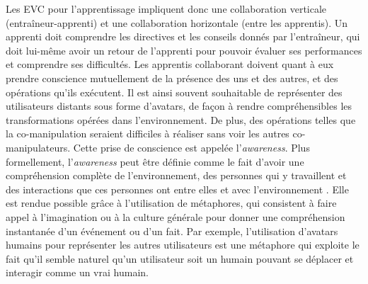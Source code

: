 \documentclass[11pt]{article}
\begin{document}
Les EVC pour l'apprentissage impliquent donc une collaboration verticale (entraîneur-apprenti) et une collaboration horizontale (entre les apprentis). Un apprenti doit comprendre les directives et les conseils donnés par l'entraîneur, qui doit lui-même avoir un retour de l'apprenti pour pouvoir évaluer ses performances et comprendre ses difficultés. Les apprentis collaborant doivent quant à eux prendre conscience mutuellement de la présence des uns et des autres, et des opérations qu'ils exécutent. Il est ainsi souvent souhaitable de représenter des utilisateurs distants sous forme d'avatars, de façon à rendre compréhensibles les transformations opérées dans l'environnement. De plus, des opérations telles que la co-manipulation seraient difficiles à réaliser sans voir les autres co-manipulateurs. Cette prise de conscience est appelée l'\textit{awareness}. Plus formellement, l'\textit{awareness} peut être définie comme le fait d'avoir une compréhension complète de l'environnement, des personnes qui y travaillent et des interactions que ces personnes ont entre elles et avec l'environnement \cite{survey}. Elle est rendue possible grâce à l'utilisation de métaphores, qui consistent à faire appel à l'imagination ou à la culture générale pour donner une compréhension instantanée d'un événement ou d'un fait. Par exemple, l'utilisation d'avatars humains pour représenter les autres utilisateurs est une métaphore qui exploite le fait qu'il semble naturel qu'un utilisateur soit un humain pouvant se déplacer et interagir comme un vrai humain.
\\
\end{document}
